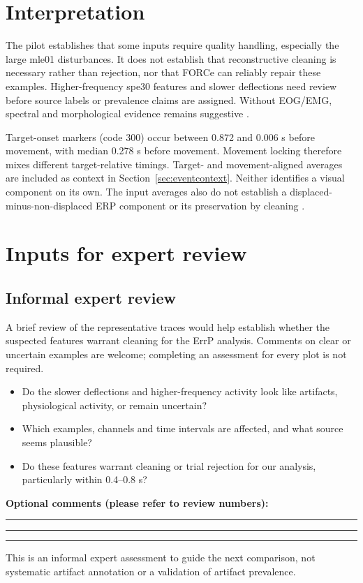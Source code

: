 \documentclass[11pt,a4paper]{article}
\begin{document}
\section{Interpretation}
The pilot establishes that some inputs require quality handling, especially the large mle01 disturbances. It does not establish that reconstructive cleaning is necessary rather than rejection, nor that FORCe can reliably repair these examples. Higher-frequency spe30 features and slower deflections need review before source labels or prevalence claims are assigned. Without EOG/EMG, spectral and morphological evidence remains suggestive \cite{whitham,plochl}.

Target-onset markers (code 300) occur between 0.872 and 0.006 s before movement, with median 0.278 s before movement. Movement locking therefore mixes different target-relative timings. Target- and movement-aligned averages are included as context in Section~\ref{sec:eventcontext}. Neither identifies a visual component on its own. The input averages also do not establish a displaced-minus-non-displaced ERP component or its preservation by cleaning \cite{graz}.

\section{Inputs for expert review}\label{sec:review}
\subsection*{Informal expert review}
A brief review of the representative traces would help establish whether the suspected features warrant cleaning for the ErrP analysis. Comments on clear or uncertain examples are welcome; completing an assessment for every plot is not required.
\begin{itemize}
\item Do the slower deflections and higher-frequency activity look like artifacts, physiological activity, or remain uncertain?
\item Which examples, channels and time intervals are affected, and what source seems plausible?
\item Do these features warrant cleaning or trial rejection for our analysis, particularly within 0.4--0.8 s?
\end{itemize}
\noindent\textbf{Optional comments (please refer to review numbers):}\par
\vspace{0.4cm}\noindent\rule{\linewidth}{0.4pt}\par
\vspace{0.4cm}\noindent\rule{\linewidth}{0.4pt}\par
\vspace{0.4cm}\noindent\rule{\linewidth}{0.4pt}\par
This is an informal expert assessment to guide the next comparison, not systematic artifact annotation or a validation of artifact prevalence.
\end{document}
